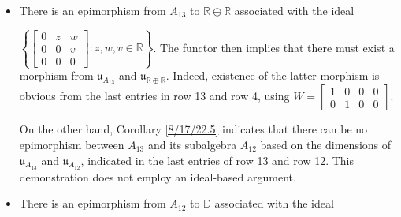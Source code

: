 \documentclass{amsart}
\numberwithin{equation}{section}
\theoremstyle{definition}
\numberwithin{theorem}{section}
\begin{document}
\begin{itemize}
\item There is an epimorphism from $A_{13}$ to $\mathbb{R}\oplus\mathbb{R}$ associated with the ideal

 $\left\{\left[\begin{array}{ccc}
0  & z & w   \\
 0 & 0 & v \\
 0 & 0 & 0    
\end{array}\right]:z,w,v\in\mathbb{R}\right\}$. The functor then implies that there must exist a morphism from $\mathfrak{u}_{A_{13}}$ and $\mathfrak{u}_{\mathbb{R}\oplus\mathbb{R}}$.  Indeed, existence of the latter morphism is obvious from the last entries in row 13 and row 4, using $W = \left[\begin{array}{cccc}
 1 & 0 & 0 & 0  \\ 
 0 & 1 & 0 & 0  
\end{array}\right]$.  

On the other hand, Corollary \ref{8/17/22.5} indicates that there can be no epimorphism between $A_{13}$ and its subalgebra $A_{12}$ based on the dimensions of $\mathfrak{u}_{A_{13}}$ and $\mathfrak{u}_{A_{12}}$, indicated in the last entries of row 13 and row 12.  This demonstration does not employ an ideal-based argument.
\item 
There is an epimorphism from $A_{12}$ to  $\mathbb{D}$ associated with the ideal


\end{itemize}
\end{document}
